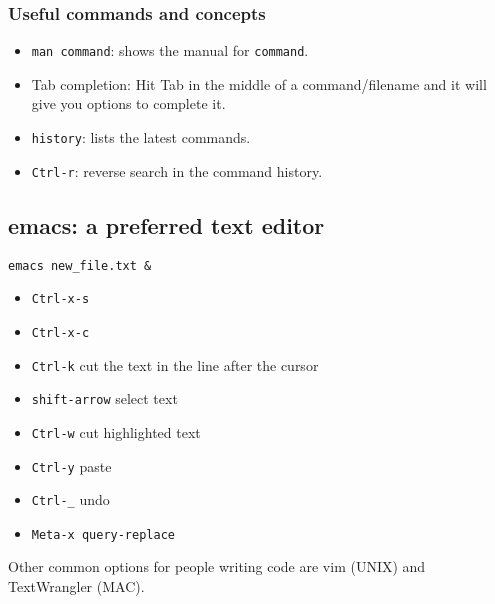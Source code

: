 \documentclass{article}
\begin{document}
\subsubsection*{Useful commands and concepts}
\begin{itemize}
\item\verb"man command": shows the manual for \verb"command".
\item Tab completion: Hit Tab in the middle of a command/filename and it will give you options to complete it.
\item\verb"history": lists the latest commands.
\item\verb"Ctrl-r": reverse search in the command history.
\end{itemize}

\subsection{emacs: a preferred text editor}

\begin{verbatim}
emacs new_file.txt &
\end{verbatim}

\begin{itemize}
\item\verb"Ctrl-x-s"
\item\verb"Ctrl-x-c"
\item\verb"Ctrl-k" cut the text in the line after the cursor
\item\verb"shift-arrow" select text
\item\verb"Ctrl-w" cut highlighted text
\item\verb"Ctrl-y" paste
\item\verb"Ctrl-_" undo
\item\verb"Meta-x query-replace"
\end{itemize}

Other common options for people writing code are vim (UNIX) and TextWrangler (MAC). 
\end{document}
